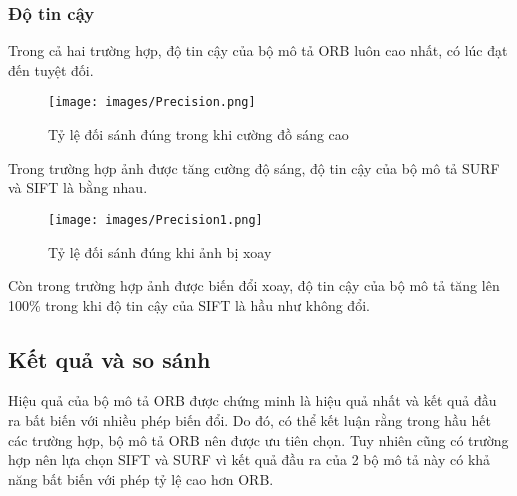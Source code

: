 \subsubsection{Độ tin cậy}
Trong cả hai trường hợp, độ tin cậy của bộ mô tả ORB luôn cao nhất, có lúc đạt đến tuyệt đối.
\begin{figure}[H]
	\centering
	\texttt{[image: images/Precision.png]}
	\caption{Tỷ lệ đối sánh đúng trong khi cường đồ sáng cao}
\end{figure}
Trong trường hợp ảnh được tăng cường độ sáng, độ tin cậy của bộ mô tả SURF và SIFT là bằng nhau.
\begin{figure}[H]
	\centering
	\texttt{[image: images/Precision1.png]}
	\caption{Tỷ lệ đối sánh đúng khi ảnh bị xoay}
\end{figure}
Còn trong trường hợp ảnh được biến đổi xoay, độ tin cậy của bộ mô tả tăng lên 100\% trong khi độ tin cậy của SIFT là hầu như không đổi.

\subsection{Kết quả và so sánh}
Hiệu quả của bộ mô tả ORB được chứng minh là hiệu quả nhất và kết quả đầu ra bất biến với nhiều phép biến đổi. Do đó, có thể kết luận rằng trong hầu hết các trường hợp, bộ mô tả ORB nên được ưu tiên chọn. Tuy nhiên cũng có trường hợp nên lựa chọn SIFT và SURF vì kết quả đầu ra của 2 bộ mô tả này có khả năng bất biến với phép tỷ lệ cao hơn ORB.